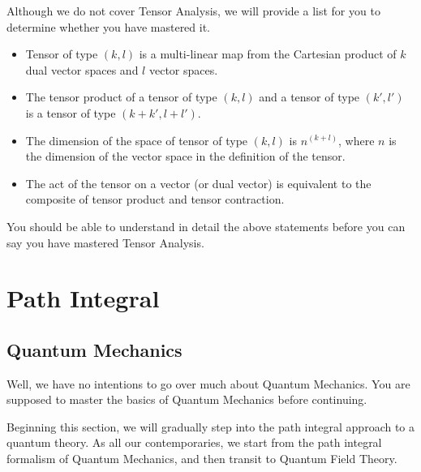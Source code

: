 \documentclass[letterpaper,10pt,english]{sphinxmanual}
\begin{document}
Although we do not cover Tensor Analysis, we will provide a list for you to determine whether you have mastered it.
\begin{itemize}
\item {} 
Tensor of type \((k, l)\) is a multi-linear map from the Cartesian product of \(k\) dual vector spaces and \(l\) vector spaces.

\item {} 
The tensor product of a tensor of type \((k, l)\) and a tensor of type \((k', l')\) is a tensor of type \((k+k', l+l')\).

\item {} 
The dimension of the space of tensor of type \((k, l)\) is \(n^{(k+l)}\), where \(n\) is the dimension of the vector space in the definition of the tensor.

\item {} 
The act of the tensor on a vector (or dual vector) is equivalent to the composite of tensor product and tensor contraction.

\end{itemize}

You should be able to understand in detail the above statements before you can say you have mastered Tensor Analysis.


\chapter{Path Integral}
\label{\detokenize{pathintgl::doc}}\label{\detokenize{pathintgl:path-integral}}

\section{Quantum Mechanics}
\label{\detokenize{pi_qm:quantum-mechanics}}\label{\detokenize{pi_qm::doc}}
Well, we have no intentions to go over much about Quantum Mechanics. You are supposed to master the basics of Quantum Mechanics before continuing.

Beginning this section, we will gradually step into the path integral approach to a quantum theory. As all our contemporaries, we start from the path integral formalism of Quantum Mechanics, and then transit to Quantum Field Theory.
\end{document}
